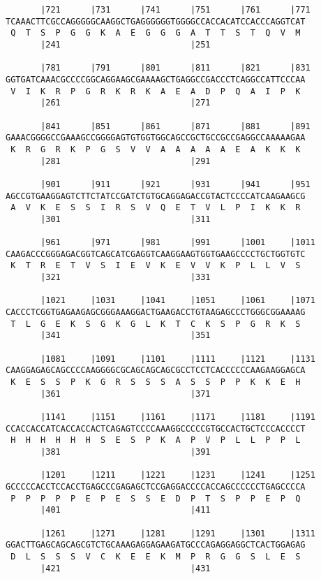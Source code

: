 \documentclass{article}
\begin{document}
\begin{Verbatim}
       |721      |731      |741      |751      |761      |771
TCAAACTTCGCCAGGGGGCAAGGCTGAGGGGGGTGGGGCCACCACATCCACCCAGGTCAT
 Q  T  S  P  G  G  K  A  E  G  G  G  A  T  T  S  T  Q  V  M 
       |241                          |251                   
  
       |781      |791      |801      |811      |821      |831
GGTGATCAAACGCCCCGGCAGGAAGCGAAAAGCTGAGGCCGACCCTCAGGCCATTCCCAA
 V  I  K  R  P  G  R  K  R  K  A  E  A  D  P  Q  A  I  P  K 
       |261                          |271                   
  
       |841      |851      |861      |871      |881      |891
GAAACGGGGCCGAAAGCCGGGGAGTGTGGTGGCAGCCGCTGCCGCCGAGGCCAAAAAGAA
 K  R  G  R  K  P  G  S  V  V  A  A  A  A  A  E  A  K  K  K 
       |281                          |291                   
  
       |901      |911      |921      |931      |941      |951
AGCCGTGAAGGAGTCTTCTATCCGATCTGTGCAGGAGACCGTACTCCCCATCAAGAAGCG
 A  V  K  E  S  S  I  R  S  V  Q  E  T  V  L  P  I  K  K  R 
       |301                          |311                   
  
       |961      |971      |981      |991      |1001     |1011
CAAGACCCGGGAGACGGTCAGCATCGAGGTCAAGGAAGTGGTGAAGCCCCTGCTGGTGTC
 K  T  R  E  T  V  S  I  E  V  K  E  V  V  K  P  L  L  V  S 
       |321                          |331                   
  
       |1021     |1031     |1041     |1051     |1061     |1071
CACCCTCGGTGAGAAGAGCGGGAAAGGACTGAAGACCTGTAAGAGCCCTGGGCGGAAAAG
 T  L  G  E  K  S  G  K  G  L  K  T  C  K  S  P  G  R  K  S 
       |341                          |351                   
  
       |1081     |1091     |1101     |1111     |1121     |1131
CAAGGAGAGCAGCCCCAAGGGGCGCAGCAGCAGCGCCTCCTCACCCCCCAAGAAGGAGCA
 K  E  S  S  P  K  G  R  S  S  S  A  S  S  P  P  K  K  E  H 
       |361                          |371                   
  
       |1141     |1151     |1161     |1171     |1181     |1191
CCACCACCATCACCACCACTCAGAGTCCCCAAAGGCCCCCGTGCCACTGCTCCCACCCCT
 H  H  H  H  H  H  S  E  S  P  K  A  P  V  P  L  L  P  P  L 
       |381                          |391                   
  
       |1201     |1211     |1221     |1231     |1241     |1251
GCCCCCACCTCCACCTGAGCCCGAGAGCTCCGAGGACCCCACCAGCCCCCCTGAGCCCCA
 P  P  P  P  P  E  P  E  S  S  E  D  P  T  S  P  P  E  P  Q 
       |401                          |411                   
  
       |1261     |1271     |1281     |1291     |1301     |1311
GGACTTGAGCAGCAGCGTCTGCAAAGAGGAGAAGATGCCCAGAGGAGGCTCACTGGAGAG
 D  L  S  S  S  V  C  K  E  E  K  M  P  R  G  G  S  L  E  S 
       |421                          |431                   
  

\end{Verbatim}
\end{document}
